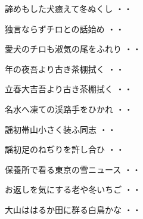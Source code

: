 \begin{shiika}諦めもした犬癒えて冬ぬくし
\hfill{・・}\end{shiika}
\vspace{0.6cm}
\begin{shiika}独言ならずチロとの話始め
\hfill{・・}\end{shiika}
\vspace{0.6cm}
\begin{shiika}愛犬のチロも淑気の尾をふれり
\hfill{・・}\end{shiika}
\vspace{0.6cm}
\begin{shiika}年の夜吾より古き茶棚拭く
\hfill{・・}\end{shiika}
\vspace{0.6cm}
\begin{shiika}立春大吉吾より古き茶棚拭く
\hfill{・・}\end{shiika}
\vspace{0.6cm}
\begin{shiika}名水へ凍ての渓路手をひかれ
\hfill{・・}\end{shiika}
\vspace{0.6cm}
\begin{shiika}謡初帯山小さく装ふ同志
\hfill{・・}\end{shiika}
\vspace{0.6cm}
\begin{shiika}謡初足のねぢりを許し合ひ
\hfill{・・}\end{shiika}
\vspace{0.6cm}
\begin{shiika}保養所で看る東京の雪ニュース
\hfill{・・}\end{shiika}
\vspace{0.6cm}
\begin{shiika}お返しを気にする老や冬いちご
\hfill{・・}\end{shiika}
\vspace{0.6cm}
\begin{shiika}大山ははるか田に群る白鳥かな
\hfill{・・}\end{shiika}
\vspace{0.6cm}

